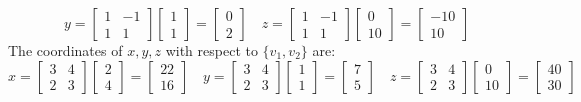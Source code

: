 \documentclass{article}
\begin{document}
\begin{enumerate}[(a)]
$$    \quad
    y = \begin{bmatrix} 1 & -1 \\ 1 & 1 \end{bmatrix} \begin{bmatrix} 1 \\ 1 \end{bmatrix}
     = \begin{bmatrix} 0 \\ 2 \end{bmatrix}
    \quad
    z = \begin{bmatrix} 1 & -1 \\ 1 & 1 \end{bmatrix} \begin{bmatrix} 0 \\ 10 \end{bmatrix}
     = \begin{bmatrix} -10 \\ 10 \end{bmatrix}
    $$
    \newline
    The coordinates of $x, y, z$ with respect to $\{v_1, v_2\}$ are:
    $$
    x = \begin{bmatrix} 3 & 4 \\ 2 & 3 \end{bmatrix} \begin{bmatrix} 2 \\ 4 \end{bmatrix}
     = \begin{bmatrix} 22 \\ 16 \end{bmatrix}
    \quad
    y = \begin{bmatrix} 3 & 4 \\ 2 & 3 \end{bmatrix} \begin{bmatrix} 1 \\ 1 \end{bmatrix}
     = \begin{bmatrix} 7 \\ 5 \end{bmatrix}
    \quad
    z = \begin{bmatrix} 3 & 4 \\ 2 & 3 \end{bmatrix} \begin{bmatrix} 0 \\ 10 \end{bmatrix}
     = \begin{bmatrix} 40 \\ 30 \end{bmatrix}
    $$


\end{enumerate}
\end{document}
